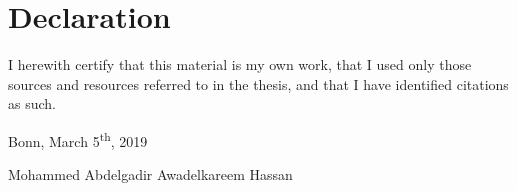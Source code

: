\documentclass[../structure.tex]{subfiles}
\begin{document}
\chapter*{Declaration}
I herewith certify that this material is my own work, that I used only
those sources and resources referred to in the thesis, and that I have
identified citations as such.

 \vspace{2cm}
Bonn, March 5\textsuperscript{th}, 2019

 \vspace{2cm}
Mohammed Abdelgadir Awadelkareem Hassan
\end{document}
